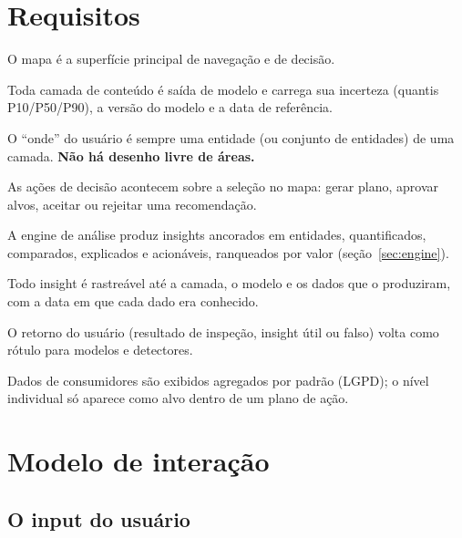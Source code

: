 \documentclass[10pt,a4paper,oneside]{article}
\begin{document}
\section{Requisitos}

\begin{requisito}
\begin{description}[leftmargin=2.2em,labelwidth=2em,font=\bfseries\color{prodcolor}]
  \item[R1] O mapa é a superfície principal de navegação e de decisão.
  \item[R2] Toda camada de conteúdo é saída de modelo e carrega sua incerteza
    (quantis P10/P50/P90), a versão do modelo e a data de referência.
  \item[R3] O ``onde'' do usuário é sempre uma entidade (ou conjunto de
    entidades) de uma camada. \textbf{Não há desenho livre de áreas.}
  \item[R4] As ações de decisão acontecem sobre a seleção no mapa: gerar
    plano, aprovar alvos, aceitar ou rejeitar uma recomendação.
  \item[R5] A engine de análise produz insights ancorados em entidades,
    quantificados, comparados, explicados e acionáveis, ranqueados por valor
    (seção~\ref{sec:engine}).
  \item[R6] Todo insight é rastreável até a camada, o modelo e os dados que o
    produziram, com a data em que cada dado era conhecido.
  \item[R7] O retorno do usuário (resultado de inspeção, insight útil ou
    falso) volta como rótulo para modelos e detectores.
  \item[R8] Dados de consumidores são exibidos agregados por padrão (LGPD); o
    nível individual só aparece como alvo dentro de um plano de ação.
\end{description}
\end{requisito}

\section{Modelo de interação}

\subsection{O input do usuário}
\end{document}
